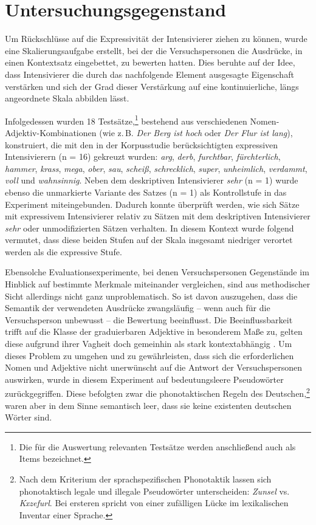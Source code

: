 \section{Untersuchungsgegenstand}\label{abs:Untersuchungsgegenstand99}
Um Rückschlüsse auf die Expressivität der Intensivierer ziehen zu können, wurde eine Skalierungsaufgabe erstellt, bei der die Versuchspersonen die Ausdrücke, in einen Kontextsatz eingebettet, zu bewerten hatten. Dies beruhte auf der Idee, dass Intensivierer die durch das nachfolgende Element ausgesagte Eigenschaft verstärken und sich der Grad dieser Verstärkung auf eine kontinuierliche, längs angeordnete Skala abbilden lässt.


Infolgedessen wurden 18 Testsätze,\footnote{Die für die Auswertung relevanten Testsätze werden anschließend auch als Items bezeichnet.} bestehend aus verschiedenen Nomen-Adjektiv-Kombinationen (wie z.\,B. \textit{Der Berg ist hoch} oder \textit{Der Flur ist lang}), konstruiert, die mit den in der Korpusstudie berücksichtigten expressiven Intensivierern (n = 16) gekreuzt wurden: \textit{arg}, \textit{derb}, \textit{furchtbar}, \textit{fürchterlich}, \textit{hammer}, \textit{krass}, \textit{mega}, \textit{ober}, \textit{sau}, \textit{scheiß}, \textit{schrecklich}, \textit{super}, \textit{unheimlich}, \textit{verdammt}, \textit{voll} und \textit{wahnsinnig}. Neben dem deskriptiven Intensivierer \textit{sehr} (n = 1) wurde ebenso die unmarkierte Variante des Satzes (n = 1) als Kontrollstufe in das Experiment miteingebunden. Dadurch konnte überprüft werden, wie sich Sätze mit expressivem Intensivierer relativ zu Sätzen mit dem deskriptiven Intensivierer \textit{sehr} oder unmodifizierten Sätzen verhalten. In diesem Kontext wurde \citet[133]{Gutzmann.2019a} folgend vermutet, dass diese beiden Stufen auf der Skala insgesamt niedriger verortet werden als die expressive Stufe.


Ebensolche Evaluationsexperimente, bei denen Versuchspersonen Gegenstände im Hinblick auf bestimmte Merkmale miteinander vergleichen, sind aus methodischer Sicht allerdings nicht ganz unproblematisch. So ist davon auszugehen, dass die Semantik der verwendeten Ausdrücke zwangsläufig -- wenn auch für die Versuchsperson unbewusst -- die Bewertung beeinflusst. Die Beeinflussbarkeit trifft auf die Klasse der graduierbaren Adjektive in besonderem Maße zu, gelten diese aufgrund ihrer Vagheit doch gemeinhin als stark kontextabhängig \citep[vgl.][11f.]{Bierwisch.1987a}. Um dieses Problem zu umgehen und zu gewährleisten, dass sich die erforderlichen Nomen und Adjektive nicht unerwünscht auf die Antwort der Versuchspersonen auswirken, wurde in diesem Experiment auf bedeutungsleere Pseudowörter zurückgegriffen. Diese befolgten zwar die phonotaktischen Regeln des Deutschen,\footnote{Nach dem Kriterium der sprachspezifischen Phonotaktik lassen sich phonotaktisch legale und illegale Pseudowörter unterscheiden: \textit{Zunsel} vs. \textit{Kxzefurl}. Bei ersteren spricht {\citet[5]{Juergenson.2009}} von einer \glqq{}zufälligen Lücke\grqq{} im lexikalischen Inventar einer Sprache.} waren aber in dem Sinne semantisch leer, dass sie keine existenten deutschen Wörter sind.


